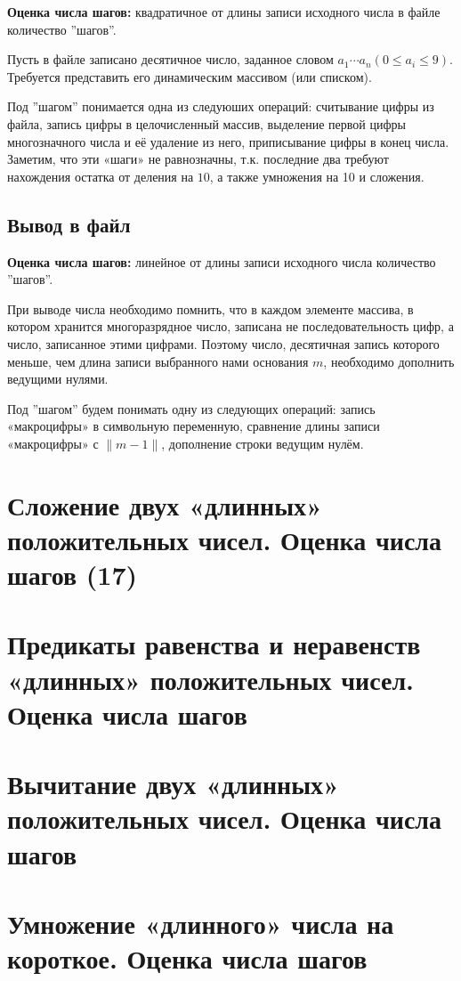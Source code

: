 \documentclass[40pt]{article}
\begin{document}
\textbf{Оценка числа шагов:} квадратичное от длины записи исходного числа в файле количество ''шагов''.

Пусть в файле записано десятичное число, заданное словом $a_{1} \cdots a_{n}\left(0 \leq a_{i} \leq 9\right)$. Требуется представить его динамическим массивом (или списком).

Под ''шагом'' понимается одна из следуюших операций:
считывание цифры из файла, запись цифры в целочисленный массив, выделение первой цифры многозначного числа и её удаление из него, приписывание цифры в конец числа. Заметим, что эти «шаги» не равнозначны, т.к. последние два требуют нахождения остатка от деления на $10$, а также умножения на 10 и сложения.

\subsection{Вывод в файл}

\textbf{Оценка числа шагов:} линейное от длины записи исходного числа количество ''шагов''.

При выводе числа необходимо помнить, что в каждом элементе массива, в котором хранится многоразрядное число, записана не последовательность цифр, а число, записанное этими цифрами. Поэтому число, десятичная запись которого меньше, чем длина записи выбранного нами основания $m$, необходимо дополнить ведущими нулями.

Под ''шагом'' будем понимать одну из следующих операций: запись «макроцифры» в символьную переменную, сравнение длины записи «макроцифры» с $\|m-1\|$, дополнение строки ведущим нулём.



\section{Сложение двух «длинных» положительных чисел. Оценка числа шагов (17)}






\section{Предикаты равенства и неравенств «длинных» положительных чисел. Оценка числа шагов}
\section{Вычитание двух «длинных» положительных чисел. Оценка числа шагов}
\section{Умножение «длинного» числа на короткое. Оценка числа шагов}
\end{document}
